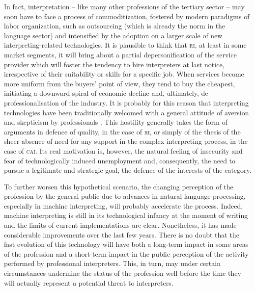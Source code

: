 \documentclass[output=paper]{langsci/langscibook}
\begin{document}
In fact, interpretation – like many other professions of the tertiary sector – may soon have to face a process of commoditization, fostered by modern paradigms of labor organization, such as outsourcing (which is already the norm in the language sector) and intensified by the adoption on a larger scale of new interpreting-related technologies. It is plausible to think that \textsc{ri}, at least in some market segments, it will bring about a partial depersonification of the service provider which will foster the tendency to hire interpreters at last notice, irrespective of their suitability or skills for a specific job. When services become more uniform from the buyers’ point of view, they tend to buy the cheapest, initiating a downward spiral of economic decline and, ultimately, de-professionalisation of the industry. It is probably for this reason that interpreting technologies have been traditionally welcomed with a general attitude of aversion and skepticism by professionals \citep{pym_what_2011}. This hostility generally takes the form of arguments in defence of quality, in the case of \textsc{ri}, or simply of the thesis of the sheer absence of need for any support in the complex interpreting process, in the case of \textsc{cai}. Its real motivation is, however, the natural feeling of insecurity and fear of technologically induced unemployment and, consequently, the need to pursue a legitimate and strategic goal, the defence of the interests of the category.  
 
\largerpage 
To further worsen this hypothetical scenario, the changing perception of the profession by the general public due to advances in natural language processing, especially in machine interpreting, will probably accelerate the process. Indeed, machine interpreting is still in its technological infancy at the moment of writing and the limits of current implementations are clear. Nonetheless, it has made considerable improvements over the last few years. There is no doubt that the fast evolution of this technology will have both a long-term impact in some areas of the profession and a short-term impact in the public perception of the activity performed by professional interpreters. This, in turn, may under certain circumstances undermine the status of the profession well before the time they will actually represent a potential threat to interpreters. 
 
\end{document}
